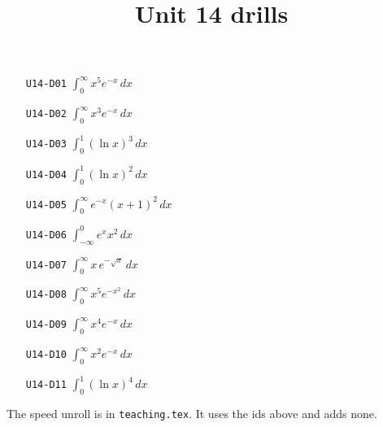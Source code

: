 
\title{Unit 14 drills}

\maketitle
\begin{enumerate}
  \item[\texttt{U14-D01}] $\displaystyle\int_{0}^{\infty}x^{5}e^{-x}\,dx$
  \item[\texttt{U14-D02}] $\displaystyle\int_{0}^{\infty}x^{3}e^{-x}\,dx$
  \item[\texttt{U14-D03}] $\displaystyle\int_{0}^{1}(\ln x)^{3}\,dx$
  \item[\texttt{U14-D04}] $\displaystyle\int_{0}^{1}(\ln x)^{2}\,dx$
  \item[\texttt{U14-D05}] $\displaystyle\int_{0}^{\infty}e^{-x}(x+1)^{2}\,dx$
  \item[\texttt{U14-D06}] $\displaystyle\int_{-\infty}^{0}e^{x}x^{2}\,dx$
  \item[\texttt{U14-D07}] $\displaystyle\int_{0}^{\infty}x\,e^{-\sqrt{x}}\,dx$
  \item[\texttt{U14-D08}] $\displaystyle\int_{0}^{\infty}x^{5}e^{-x^{2}}\,dx$
  \item[\texttt{U14-D09}] $\displaystyle\int_{0}^{\infty}x^{4}e^{-x}\,dx$
  \item[\texttt{U14-D10}] $\displaystyle\int_{0}^{\infty}x^{2}e^{-x}\,dx$
  \item[\texttt{U14-D11}] $\displaystyle\int_{0}^{1}(\ln x)^{4}\,dx$
\end{enumerate}
\noindent The speed unroll is in \texttt{teaching.tex}. It uses the ids above and adds none.


